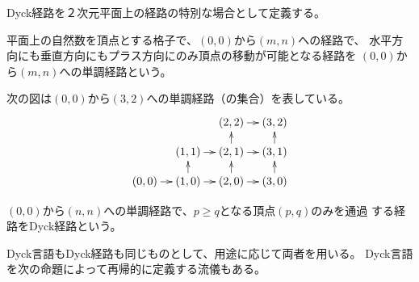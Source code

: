 {	Dyck経路を２次元平面上の経路の特別な場合として定義する。

	\begin{definition}\label{def:単調経路} %
		平面上の自然数を頂点とする格子で、$(0,0)$から$(m,n)$への経路で、
		水平方向にも垂直方向にもプラス方向にのみ頂点の移動が可能となる経路を
		$(0,0)$から$(m,n)$への単調経路という。
	\end{definition} %

	次の図は$(0,0)$から$(3,2)$への単調経路（の集合）を表している。
	\begin{equation*}\xymatrix@R=1em@C=1em{
		& & (2,2) \ar[r] & (3,2) \\
		& (1,1) \ar[r] & (2,1) \ar[r] \ar[u] & (3,1) \ar[u] \\
		(0,0) \ar[r] & (1,0) \ar[r] \ar[u] & (2,0) \ar[r] \ar[u]
			& (3,0) \ar[u] \\
	}\end{equation*}

	\begin{definition}[Dyck経路]\label{def:Dyck経路} %
		$(0,0)$から$(n,n)$への単調経路で、$p\ge q$となる頂点$(p,q)$のみを通過
		する経路をDyck経路という。
	\end{definition} %

	Dyck言語もDyck経路も同じものとして、用途に応じて両者を用いる。
	Dyck言語を次の命題によって再帰的に定義する流儀もある。

}
